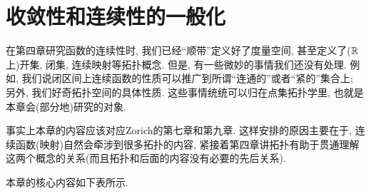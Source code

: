 \chapter{收敛性和连续性的一般化}

在第四章研究函数的连续性时, 我们已经“顺带”定义好了度量空间, 甚至定义了($\mathbb{R}$上)开集, 闭集, 连续映射等拓扑概念. 但是, 有一些微妙的事情我们还没有处理. 例如, 我们说闭区间上连续函数的性质可以推广到所谓“连通的”或者“紧的”集合上; 另外, 我们好奇拓扑空间的具体性质. 这些事情统统可以归在点集拓扑学里, 也就是本章会(部分地)研究的对象. 

事实上本章的内容应该对应Zorich的第七章和第九章. 这样安排的原因主要在于, 连续函数(映射)自然会牵涉到很多拓扑的内容, 紧接着第四章讲拓扑有助于贯通理解这两个概念的关系(而且拓扑和后面的内容没有必要的先后关系). 

本章的核心内容如下表所示. 

